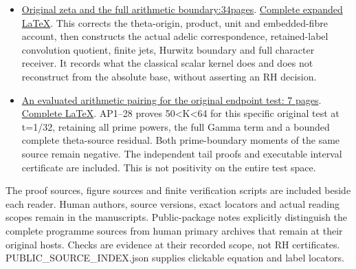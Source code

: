 \documentclass[
]{article}
\begin{document}
\begin{itemize}
{  zeta, shifted theta and coefficient-algebra correction:complete
  source}. This source-only delivery proves the retained pair and
  inverse, all exceptional jets, the changed product and unit, and the
  distinct original Hurwitz and returned classical-heat tangents. No PDF
  is claimed for this delivery.
\item
  \href{https://github.com/KokunoYumeto/zeta-function-research-reader/blob/main/workbenches/splitzero-tandem/continuations/20260923-retained-source-readers/original-zeta-full-boundary/CC_WEIL_BOUNDARY_READER.pdf}{Original
  zeta and the full arithmetic boundary:34pages}.
  \href{https://github.com/KokunoYumeto/zeta-function-research-reader/blob/main/workbenches/splitzero-tandem/continuations/20260923-retained-source-readers/original-zeta-full-boundary/CC_WEIL_BOUNDARY_READER.tex}{Complete
  expanded LaTeX}. This corrects the theta-origin, product, unit and
  embedded-fibre account, then constructs the actual adelic
  correspondence, retained-label convolution quotient, finite jets,
  Hurwitz boundary and full character receiver. It records what the
  classical scalar kernel does and does not reconstruct from the
  absolute base, without asserting an RH decision.
\item
  \href{https://github.com/KokunoYumeto/zeta-function-research-reader/blob/main/workbenches/splitzero-tandem/continuations/20260923-retained-source-readers/arithmetic-pairing/NOTE.pdf}{An
  evaluated arithmetic pairing for the original endpoint test: 7 pages}.
  \href{https://github.com/KokunoYumeto/zeta-function-research-reader/blob/main/workbenches/splitzero-tandem/continuations/20260923-retained-source-readers/arithmetic-pairing/ACTUAL_ENDPOINT_PAIRING.tex}{Complete
  LaTeX}. AP1--28 proves 50\textless K\textless64 for this specific
  original test at t=1/32, retaining all prime powers, the full Gamma
  term and a bounded complete theta-source residual. Both prime-boundary
  moments of the same source remain negative. The independent tail
  proofs and executable interval certificate are included. This is not
  positivity on the entire test space.
\end{itemize}

The proof sources, figure sources and finite verification scripts are
included beside each reader. Human authors, source versions, exact
locators and actual reading scopes remain in the manuscripts.
Public-package notes explicitly distinguish the complete programme
sources from human primary archives that remain at their original hosts.
Checks are evidence at their recorded scope, not RH certificates.
PUBLIC\_SOURCE\_INDEX.json supplies clickable equation and label
locators.
\end{document}
